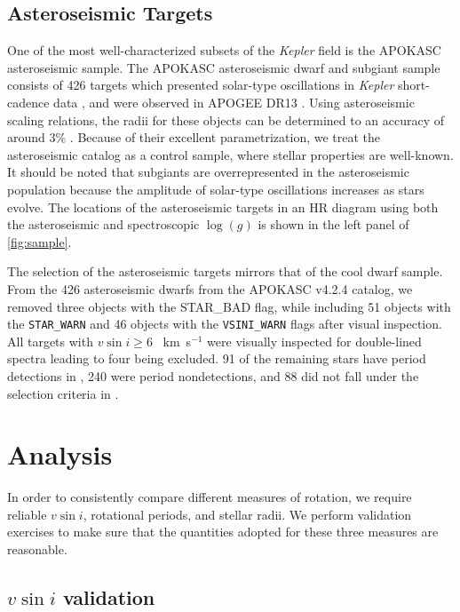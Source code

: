 \documentclass[manuscript]{aastex6}
\newcommand{\vsini}{\ensuremath{v \sin i}}
\newcommand{\Kepler}{\mbox{\textit{Kepler}}}
\newcommand{\logg}{\ensuremath{\log(g)}}
\newcommand{\kms}{\textrm{~km~s}\ensuremath{^{-1}}}
\newcommand{\STARWARN}{\texttt{STAR\_WARN}}
\newcommand{\VSINIWARN}{\texttt{VSINI\_WARN}}
\begin{document}
\subsection{Asteroseismic Targets}

One of the most well-characterized subsets of the \Kepler{} field is the
APOKASC asteroseismic sample. The APOKASC asteroseismic dwarf and subgiant 
sample consists of 426 targets which presented solar-type oscillations in 
\Kepler{} short-cadence data \citep{Chaplin11}, and were observed in APOGEE DR13
\citep{Majewski17}. Using asteroseismic scaling relations, the radii
for these objects can be determined to an accuracy of around 3\%
\citep{Serenelli17}. Because of their excellent parametrization, we treat the
asteroseismic catalog as a control sample, where stellar properties are
well-known. It should be noted that subgiants are overrepresented in
the asteroseismic population because the amplitude of solar-type oscillations 
increases as stars evolve. The locations of the asteroseismic targets in an HR
diagram using both the asteroseismic and spectroscopic \logg{} is shown in 
the left panel of \cref{fig:sample}.

The selection of the asteroseismic targets mirrors that of the cool dwarf
sample. From the 426 asteroseismic dwarfs from the APOKASC v4.2.4 catalog, we 
removed three objects with the STAR\_BAD flag, while including 51 objects with 
the \STARWARN{} and 46 objects with the \VSINIWARN{} flags after visual 
inspection. All targets with \(\vsini \ge 6\) \kms{} were visually
inspected for double-lined spectra leading to four being excluded. 91 of 
the remaining stars have period detections in \citet{McQuillan14}, 240 were 
period nondetections, and 88 did not fall under the selection criteria in 
\citet{McQuillan14}. 

\section{Analysis}
\label{sec:analysis}

In order to consistently compare different measures of rotation, we require 
reliable \vsini{}, rotational periods, and stellar radii. We perform validation
exercises to make sure that the quantities adopted for these three measures are 
reasonable.


\subsection{\vsini{} validation}
\label{sec:vsini_check}
\end{document}
